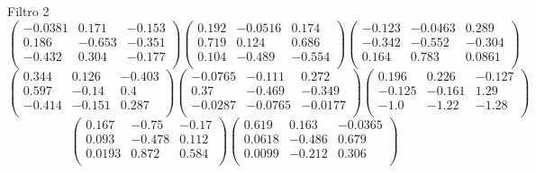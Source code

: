 Filtro 2
{ \small
\[
\begin{pmatrix}
  -0.0381 & 0.171 & -0.153 \\
  0.186 & -0.653 & -0.351 \\
  -0.432 & 0.304 & -0.177 \\
\end{pmatrix}
\begin{pmatrix}
  0.192 & -0.0516 & 0.174 \\
  0.719 & 0.124 & 0.686 \\
  0.104 & -0.489 & -0.554 \\
\end{pmatrix}
\begin{pmatrix}
  -0.123 & -0.0463 & 0.289 \\
  -0.342 & -0.552 & -0.304 \\
  0.164 & 0.783 & 0.0861 \\
\end{pmatrix}
\]
\[
\begin{pmatrix}
  0.344 & 0.126 & -0.403 \\
  0.597 & -0.14 & 0.4 \\
  -0.414 & -0.151 & 0.287 \\
\end{pmatrix}
\begin{pmatrix}
  -0.0765 & -0.111 & 0.272 \\
  0.37 & -0.469 & -0.349 \\
  -0.0287 & -0.0765 & -0.0177 \\
\end{pmatrix}
\begin{pmatrix}
  0.196 & 0.226 & -0.127 \\
  -0.125 & -0.161 & 1.29 \\
  -1.0 & -1.22 & -1.28 \\
\end{pmatrix}
\]
\[
\begin{pmatrix}
  0.167 & -0.75 & -0.17 \\
  0.093 & -0.478 & 0.112 \\
  0.0193 & 0.872 & 0.584 \\
\end{pmatrix}
\begin{pmatrix}
  0.619 & 0.163 & -0.0365 \\
  0.0618 & -0.486 & 0.679 \\
  0.0099 & -0.212 & 0.306 \\
\end{pmatrix}
\]
}

